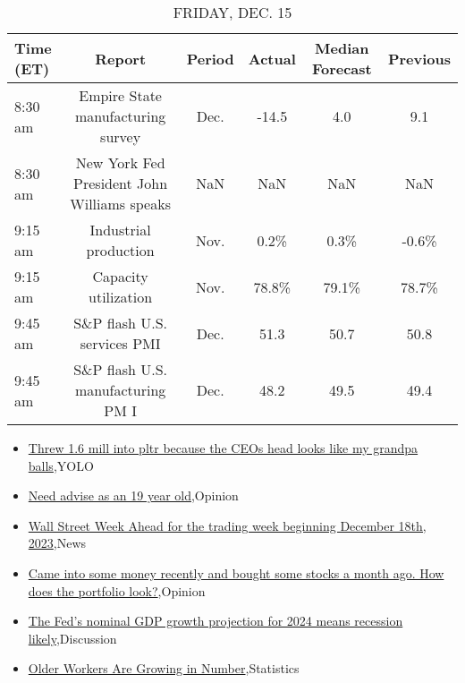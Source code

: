 \documentclass{article}%
\begin{document}
%


\begin{table}[htbp]%
\caption{FRIDAY, DEC. 15}%
\centering%
\begin{adjustbox}{width=1\textwidth}%
\begin{tabular}{lccccc}
\toprule
Time (ET) &                                      Report & Period & Actual & Median Forecast & Previous \\
\midrule
  8:30 am &           Empire State manufacturing survey &   Dec. &  -14.5 &             4.0 &      9.1 \\
  8:30 am & New York Fed President John Williams speaks &    NaN &    NaN &             NaN &      NaN \\
  9:15 am &                       Industrial production &   Nov. &   0.2\% &            0.3\% &    -0.6\% \\
  9:15 am &                        Capacity utilization &   Nov. &  78.8\% &           79.1\% &    78.7\% \\
  9:45 am &                 S\&P flash U.S. services PMI &   Dec. &   51.3 &            50.7 &     50.8 \\
  9:45 am &           S\&P flash U.S. manufacturing PM I &   Dec. &   48.2 &            49.5 &     49.4 \\
\bottomrule
\end{tabular}
%
\end{adjustbox}%
\end{table}

%
\begin{itemize}%
\item%
\href{https://reddit.com/r/wallstreetbets/comments/18jl7hf/threw\_16\_mill\_into\_pltr\_because\_the\_ceos\_head/}{Threw 1.6 mill into pltr because the CEOs head looks like my grandpa balls},YOLO%
\item%
\href{https://reddit.com/r/StockMarket/comments/18j8emx/need\_advise\_as\_an\_19\_year\_old/}{Need advise as an 19 year old},Opinion%
\item%
\href{https://reddit.com/r/StockMarket/comments/18j7o7p/wall\_street\_week\_ahead\_for\_the\_trading\_week/}{Wall Street Week Ahead for the trading week beginning December 18th, 2023},News%
\item%
\href{https://reddit.com/r/StockMarket/comments/18j4a2t/came\_into\_some\_money\_recently\_and\_bought\_some/}{Came into some money recently and bought some stocks a month ago. How does the portfolio look?},Opinion%
\item%
\href{https://reddit.com/r/StockMarket/comments/18j3w41/the\_feds\_nominal\_gdp\_growth\_projection\_for\_2024/}{The Fed's nominal GDP growth projection for 2024 means recession likely},Discussion%
\item%
\href{https://reddit.com/r/Economics/comments/18jjojf/older\_workers\_are\_growing\_in\_number/}{Older Workers Are Growing in Number},Statistics%
\end{itemize}%
\end{document}
